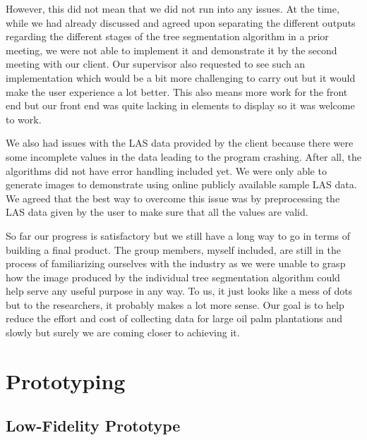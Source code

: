\documentclass[a4paper, 12pt]{article}
\begin{document}
However, this did not mean that we did not run into any issues. At the time, while we had already discussed and agreed upon separating the different outputs regarding the different stages of the tree segmentation algorithm in a prior meeting, we were not able to implement it and demonstrate it by the second meeting with our client. Our supervisor also requested to see such an implementation which would be a bit more challenging to carry out but it would make the user experience a lot better. This also means more work for the front end but our front end was quite lacking in elements to display so it was welcome to work.

We also had issues with the LAS data provided by the client because there were some incomplete values in the data leading to the program crashing. After all, the algorithms did not have error handling included yet. We were only able to generate images to demonstrate using online publicly available sample LAS data. We agreed that the best way to overcome this issue was by preprocessing the LAS data given by the user to make sure that all the values are valid.

So far our progress is satisfactory but we still have a long way to go in terms of building a final product. The group members, myself included, are still in the process of familiarizing ourselves with the industry as we were unable to grasp how the image produced by the individual tree segmentation algorithm could help serve any useful purpose in any way. To us, it just looks like a mess of dots but to the researchers, it probably makes a lot more sense. Our goal is to help reduce the effort and cost of collecting data for large oil palm plantations and slowly but surely we are coming closer to achieving it.

\section{Prototyping}

\subsection{Low-Fidelity Prototype}
\end{document}

